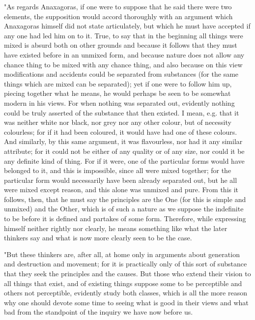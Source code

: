"As regards Anaxagoras, if one were to suppose that he said there
were two elements, the supposition would accord thoroughly with an
argument which Anaxagoras himself did not state articulately, but
which he must have accepted if any one had led him on to it. True,
to say that in the beginning all things were mixed is absurd both
on other grounds and because it follows that they must have existed
before in an unmixed form, and because nature does not allow any chance
thing to be mixed with any chance thing, and also because on this
view modifications and accidents could be separated from substances
(for the same things which are mixed can be separated); yet if one
were to follow him up, piecing together what he means, he would perhaps
be seen to be somewhat modern in his views. For when nothing was separated
out, evidently nothing could be truly asserted of the substance that
then existed. I mean, e.g. that it was neither white nor black, nor
grey nor any other colour, but of necessity colourless; for if it
had been coloured, it would have had one of these colours. And similarly,
by this same argument, it was flavourless, nor had it any similar
attribute; for it could not be either of any quality or of any size,
nor could it be any definite kind of thing. For if it were, one of
the particular forms would have belonged to it, and this is impossible,
since all were mixed together; for the particular form would necessarily
have been already separated out, but he all were mixed except reason,
and this alone was unmixed and pure. From this it follows, then, that
he must say the principles are the One (for this is simple and unmixed)
and the Other, which is of such a nature as we suppose the indefinite
to be before it is defined and partakes of some form. Therefore, while
expressing himself neither rightly nor clearly, he means something
like what the later thinkers say and what is now more clearly seen
to be the case. 

"But these thinkers are, after all, at home only in arguments about
generation and destruction and movement; for it is practically only
of this sort of substance that they seek the principles and the causes.
But those who extend their vision to all things that exist, and of
existing things suppose some to be perceptible and others not perceptible,
evidently study both classes, which is all the more reason why one
should devote some time to seeing what is good in their views and
what bad from the standpoint of the inquiry we have now before us.

